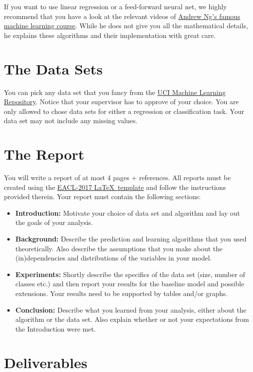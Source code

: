 \documentclass[11pt, leqno, a4paper]{article}
\begin{document}
If you want to use linear regression or a feed-forward neural net, we highly recommend that you have a look at the relevant videos of  
\href{https://www.coursera.org/learn/machine-learning}{Andrew Ng's famous machine learning course}. While he does not give you all the mathematical details, he
explains these algorithms and their implementation with great care.

\section{The Data Sets}

You can pick any data set that you fancy from the \href{http://archive.ics.uci.edu/ml/}{UCI Machine Learning Repository}. Notice that your supervisor has to approve
of your choice. You are only allowed to chose data sets for either a regression or classification task. Your data set may not include any missing values.

\section{The Report}

You will write a report of at most 4 pages + references. All reports must be created using the 
\href{http://eacl2017.org/images/site/eacl-2017-template.zip}{EACL-2017 \LaTeX \ template} and follow the instructions provided therein. Your report must
contain the following sections:
\begin{itemize}
\item \textbf{Introduction:} Motivate your choice of data set and algorithm and lay out the goals of your analysis.
\item \textbf{Background:} Describe the prediction and learning algorithms that you used theoretically. Also describe the assumptions that you make about
the (in)dependencies and distributions of the variables in your model.
\item \textbf{Experiments:} Shortly describe the specifics of the data set (size, number of classes etc.) and then report your results for the baseline model
and possible extensions. Your results need to be supported by tables and/or graphs.
\item \textbf{Conclusion:} Describe what you learned from your analysis, either about the algorithm or the data set. Also explain whether or not your expectations
from the Introduction were met.
\end{itemize}

\section{Deliverables}
\end{document}
